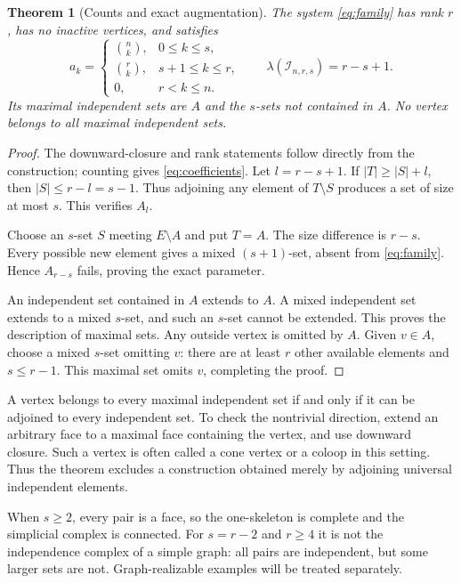 \documentclass[11pt,letterpaper]{article}
\numberwithin{equation}{section}
\newtheorem{theorem}{Theorem}[section]
\theoremstyle{definition}
\theoremstyle{remark}
\newcommand{\I}{\mathcal I}
\begin{document}
\begin{theorem}[Counts and exact augmentation]\label{thm:family}
The system \eqref{eq:family} has rank $r$, has no inactive vertices, and
satisfies
\begin{equation}\label{eq:coefficients}
 a_k=\begin{cases}
 \binom nk,&0\le k\le s,\\
 \binom rk,&s+1\le k\le r,\\
 0,&r<k\le n.
 \end{cases}
 \qquad
 \lambda(\I_{n,r,s})=r-s+1.
\end{equation}
Its maximal independent sets are $A$ and the $s$-sets not contained in $A$.
No vertex belongs to all maximal independent sets.
\end{theorem}
\begin{proof}
The downward-closure and rank statements follow directly from the
construction; counting gives \eqref{eq:coefficients}.
Let $l=r-s+1$. If $|T|\ge |S|+l$, then $|S|\le r-l=s-1$.
Thus adjoining any element of $T\setminus S$ produces a set of size at
most $s$. This verifies $A_l$.

Choose an $s$-set $S$ meeting $E\setminus A$ and put $T=A$.
The size difference is $r-s$. Every possible new element gives a mixed
$(s+1)$-set, absent from \eqref{eq:family}. Hence $A_{r-s}$ fails,
proving the exact parameter.

An independent set contained in $A$ extends to $A$. A mixed independent
set extends to a mixed $s$-set, and such an $s$-set cannot be extended.
This proves the description of maximal sets. Any outside vertex is omitted
by $A$. Given $v\in A$, choose a mixed $s$-set omitting $v$: there are at
least $r$ other available elements and $s\le r-1$. This maximal set omits
$v$, completing the proof.
\end{proof}

A vertex belongs to every maximal independent set if and only if it can be
adjoined to every independent set. To check the nontrivial direction,
extend an arbitrary face to a maximal face containing the vertex, and use
downward closure. Such a vertex is often called a cone vertex or a coloop
in this setting. Thus the theorem excludes a construction obtained merely
by adjoining universal independent elements.

When $s\ge2$, every pair is a face, so the one-skeleton is complete and the
simplicial complex is connected. For $s=r-2$ and $r\ge4$ it is not the
independence complex of a simple graph: all pairs are independent, but some
larger sets are not. Graph-realizable examples will be treated separately.
\end{document}
